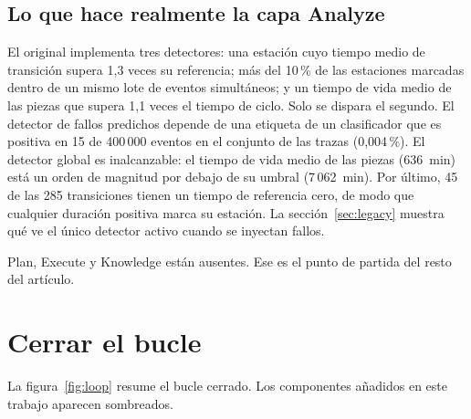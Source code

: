 \documentclass[preprint,11pt]{elsarticle}
\begin{document}
\subsection{Lo que hace realmente la capa Analyze}
El original implementa tres detectores: una estación cuyo tiempo medio de transición supera 1{,}3 veces su referencia; más del 10\,\% de las estaciones marcadas dentro de un mismo lote de eventos simultáneos; y un tiempo de vida medio de las piezas que supera 1{,}1 veces el tiempo de ciclo. Solo se dispara el segundo. El detector de fallos predichos depende de una etiqueta de un clasificador que es positiva en 15 de 400\,000 eventos en el conjunto de las trazas (0{,}004\,\%). El detector global es inalcanzable: el tiempo de vida medio de las piezas (636~min) está un orden de magnitud por debajo de su umbral (7\,062~min). Por último, 45 de las 285 transiciones tienen un tiempo de referencia cero, de modo que cualquier duración positiva marca su estación. La sección~\ref{sec:legacy} muestra qué ve el único detector activo cuando se inyectan fallos.

Plan, Execute y Knowledge están ausentes. Ese es el punto de partida del resto del artículo.

\section{Cerrar el bucle}
\label{sec:loop}

La figura~\ref{fig:loop} resume el bucle cerrado. Los componentes añadidos en este trabajo aparecen sombreados.
\end{document}
